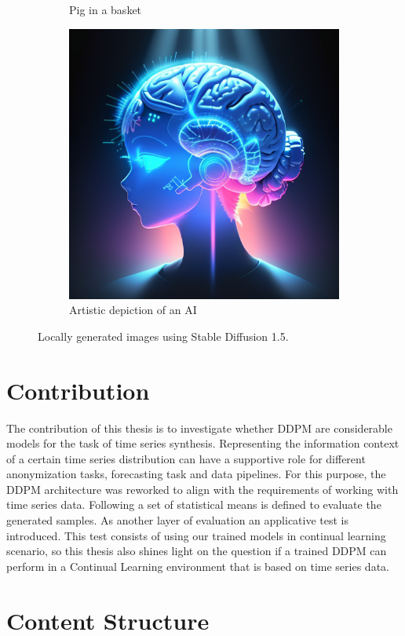 \begin{figure}
\begin{subfigure}{0.5\linewidth}
        \caption[Pig in a basket]%
        {{\small Pig in a basket}}    
        \label{fig:sd3}
    \end{subfigure}%
    \begin{subfigure}{0.5\linewidth}   
        \centering 
        \includegraphics[width=0.5\linewidth]{images/sd4.png}
        \caption[Artistic depiction of an AI]%
        {{\small Artistic depiction of an AI}}    
        \label{fig:sd4}
    \end{subfigure}%
    \caption[ Locally generated images using Stable Diffusion 1.5 ]
    {\small Locally generated images using Stable Diffusion 1.5.} 
    \label{fig:sd images}
\end{figure}

\section{Contribution}
\label{sec:contribution}

The contribution of this thesis is to investigate whether DDPM are considerable models for the task of 
time series synthesis. Representing the information context of a certain time series distribution can have a supportive
role for different anonymization tasks, forecasting task and data pipelines. For this purpose, the DDPM architecture was reworked to align with the requirements of working with time series data. Following a set of statistical means is defined to evaluate the generated samples.
As another layer of evaluation an applicative test is introduced. This test consists of using our trained models in continual learning scenario, so this thesis also shines light on the question if 
a trained DDPM can perform in a Continual Learning environment that is based on time series data.

\section{Content Structure}
\label{sec:contentstructure}


